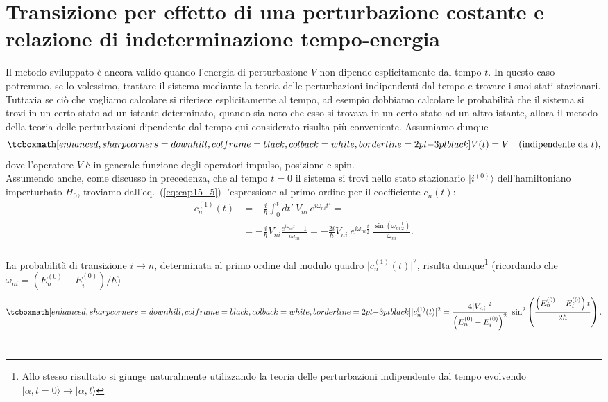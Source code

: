 \documentclass[a4paper,12pt,oneside]{book}
\begin{document}
\section{Transizione per effetto di una perturbazione costante e relazione di indeterminazione tempo-energia}
Il metodo sviluppato è ancora valido quando l'energia di perturbazione $V$ non dipende esplicitamente dal tempo $t$. In questo caso potremmo, se lo volessimo, trattare il sistema  mediante la teoria delle perturbazioni indipendenti dal tempo e trovare i suoi stati stazionari. Tuttavia se ciò che vogliamo calcolare si riferisce esplicitamente al tempo, ad esempio dobbiamo calcolare le probabilità che il sistema si trovi in un certo stato ad un istante determinato, quando sia noto che esso si trovava in un certo stato ad un altro istante, allora il metodo della teoria delle perturbazioni dipendente dal tempo qui considerato risulta più conveniente. Assumiamo dunque
	\begin{equation}
		\tcboxmath[enhanced, sharp corners=downhill, colframe=black, colback=white, borderline={2pt}{-3pt}{black}]{
			V(t) = V \quad \textrm{(indipendente da }t\textrm{),}
			}
	\end{equation}
dove l'operatore $V$ è in generale funzione degli operatori impulso, posizione e spin.\\

Assumendo anche, come discusso in precedenza, che al tempo $t=0$ il sistema si trovi nello stato stazionario $\vert i^{(0)}\rangle $ dell'hamiltoniano imperturbato $H_0$, troviamo dall'eq.~(\ref{eq:cap15_5}) l'espressione al primo ordine per il coefficiente $c_n (t)$:
	\begin{align}
		c_n ^{(1)} (t) & =  -\frac{i}{\hbar} \int _0 ^t dt'\ V_{ni}\, e^{i \omega _{ni} t'} = \nonumber \\
		&= -\frac{i}{\hbar} V_{ni} \frac{e^{i \omega _{ni} t}-1}{i \omega _{ni}}= -\frac{2i}{\hbar} V_{ni}\ e^{i \omega _{ni} \frac{t}{2}}\ \frac{\sin{\left(\omega _{ni} \frac{t}{2}\right)}}{\omega _{ni}} .
	\end{align}\\
	
La probabilità di transizione $i\rightarrow n $, determinata al primo ordine dal modulo quadro $\vert c_n ^{(1)} (t) \vert ^2$, risulta dunque\footnote{Allo stesso risultato si giunge naturalmente utilizzando la teoria delle perturbazioni indipendente dal tempo evolvendo $ \vert \alpha , t =0 \rangle \rightarrow \vert \alpha , t \rangle$} (ricordando che $\omega _{ni} = ( E_n ^{(0)}- E_i ^{(0)})/ \hbar$)
	\begin{equation}
		\tcboxmath[enhanced, sharp corners=downhill, colframe=black, colback=white, borderline={2pt}{-3pt}{black}]{
			\vert c_n ^{(1)} (t) \vert ^2 = \frac{4\vert V_{ni} \vert ^2}{\left( E_n ^{(0)} - E_i ^{(0)} \right) ^2}\ \sin ^2\left(\frac{\left( E_n ^{(0)} - E_i ^{(0)} \right) t}{2 \hbar}\right).
			}
	\label{eq:cap15_6}
	\end{equation}\\
	
\end{document}
